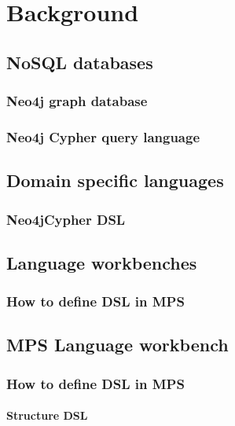 \chapter{Background}

\section{NoSQL databases}

	\subsection{Neo4j graph database}

	\subsection{Neo4j Cypher query language}
	

\section{Domain specific languages}

	\subsection{Neo4jCypher DSL}



\section{Language workbenches}

	\subsection{How to define DSL in MPS}



\section{MPS Language workbench}

	\subsection{How to define DSL in MPS}

		\subsubsection{Structure DSL}
